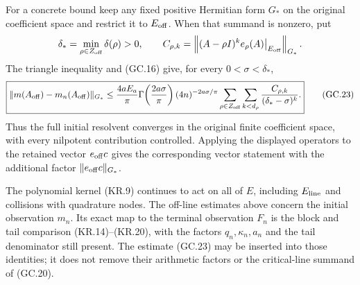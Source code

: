 For a concrete bound keep any fixed positive Hermitian form
\(G_*\) on the original coefficient space and restrict it to
\(E_{\rm off}\).  When that summand is nonzero, put
\[
 \delta_* =\min_{\rho\in Z_{\rm off}}\delta(\rho)>0,
 \qquad
 C_{\rho,k}=\left\|(A-\rho I)^ke_\rho(A)
                      \big|_{E_{\rm off}}\right\|_{G_*}.
\]
The triangle inequality and (GC.16) give, for every
\(0<\sigma<\delta_*\),
\[
 \boxed{\displaystyle
 \|m(A_{\rm off})-m_n(A_{\rm off})\|_{G_*}
 \leq\frac{4aE_a}{\pi}
       \Gamma\!\left(\frac{2a\sigma}{\pi}\right)
       (4n)^{-2a\sigma/\pi}
       \sum_{\rho\in Z_{\rm off}}\sum_{k<d_\rho}
             \frac{C_{\rho,k}}{(\delta_*-\sigma)^k}.}     \tag{GC.23}
\]
Thus the full initial resolvent converges in the original finite
coefficient space, with every nilpotent contribution controlled.
Applying the displayed operators to the retained vector
\(e_{\rm off}c\) gives the corresponding vector statement with
the additional factor \(\|e_{\rm off}c\|_{G_*}\).

The polynomial kernel (KR.9) continues to act on all of \(E\),
including \(E_{\rm line}\) and collisions with quadrature nodes.
The off-line estimates above concern the initial observation
\(m_n\).  Its exact map to the terminal observation \(F_n\) is
the block and tail comparison (KR.14)--(KR.20), with the factors
\(q_n,\kappa_n,a_n\) and the tail denominator still present.
The estimate (GC.23) may be inserted into those identities; it
does not remove their arithmetic factors or the critical-line
summand of (GC.20).
